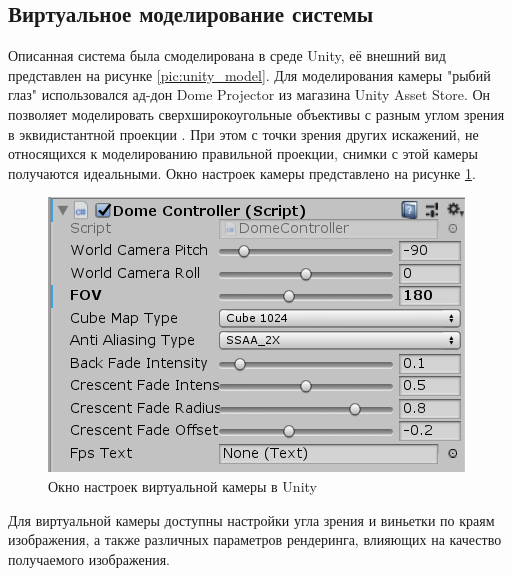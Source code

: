 \subsection{Виртуальное моделирование системы}

Описанная система была смоделирована в среде Unity, её внешний вид представлен на рисунке \ref{pic:unity_model}. Для 
моделирования камеры "рыбий глаз" использовался ад-дон Dome Projector из магазина Unity Asset Store.    %
Он позволяет моделировать сверхширокоугольные объективы с разным углом зрения в эквидистантной проекции \cite{}. %
При этом с точки зрения других искажений, не относящихся к моделированию правильной проекции, снимки с этой камеры получаются идеальными. %
Окно настроек камеры представлено на рисунке \ref{pic:camera_settings}.
\begin{figure}[H]
    \begin{center}
        \includegraphics[scale=0.5]{pics/camera_settings.png}                                                                                            %
        \caption{Окно настроек виртуальной камеры в Unity}
        \label{pic:camera_settings}
    \end{center}
\end{figure}
Для виртуальной камеры доступны настройки угла зрения и виньетки по краям изображения,  %
а также различных параметров рендеринга, влияющих на качество получаемого изображения. 